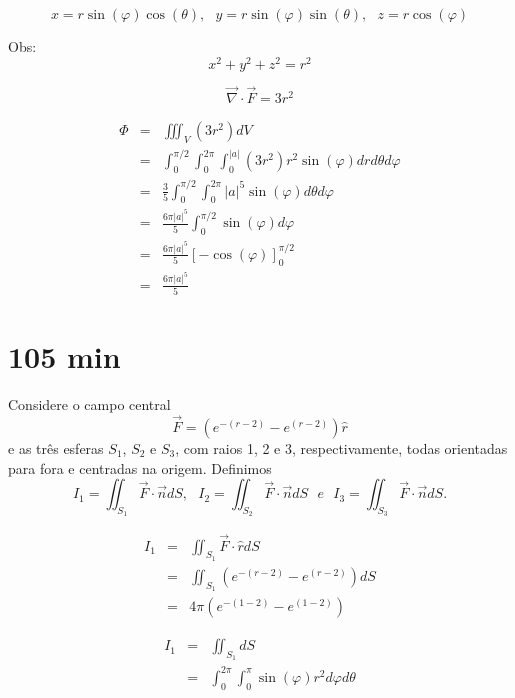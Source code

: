 \documentclass[a4paper,10pt]{book}
\begin{document}
 $$x=r\sin(\varphi)\cos(\theta) ,~~~ y=r\sin(\varphi)\sin(\theta), ~~~z=r \cos(\varphi)$$

Obs: $$x^2+y^2+z^2=r^2$$


$$\vec{\nabla}\cdot \vec{F}=3r^2$$

\begin{eqnarray*}\Phi&=&\iiint_V(3r^2)dV\\
&=&\int_0^{\pi/2} \int_0^{2\pi} \int_0^{|a|}(3r^2) r^2\sin(\varphi) dr d\theta d\varphi\\
&=&\frac{3}{5}\int_0^{\pi/2} \int_0^{2\pi} |a|^5\sin(\varphi)  d\theta d\varphi\\
&=&\frac{6\pi|a|^5}{5}\int_0^{\pi/2}  \sin(\varphi)  d\varphi\\
&=&\frac{6\pi|a|^5}{5}\left[-\cos(\varphi)\right]_0^{\pi/2}\\
&=&\frac{6\pi|a|^5}{5}
\end{eqnarray*}


\section{105 min}

Considere o campo central $$\vec {F}=(e^{-(r-2)}-e^{(r-2)})\hat {r}$$
e as três esferas $S_1$, $S_2$ e $S_3$, com raios 1, 2 e 3, respectivamente, todas orientadas para fora e centradas na origem. Definimos $$I_1=\iint _{S_1}\vec {F}\cdot \vec {n}dS,~~~ I_2=\iint _{S_2}\vec {F}\cdot \vec {n}dS ~~~ e  ~~~ I_3=\iint _{S_3}\vec {F}\cdot \vec {n}dS.$$

\begin{eqnarray*}I_1&=&\iint _{S_1}\vec {F}\cdot \hat {r}dS\\
&=&\iint _{S_1}(e^{-(r-2)}-e^{(r-2)})dS\\
&=&4\pi(e^{-(1-2)}-e^{(1-2)})
 \end{eqnarray*}

\begin{eqnarray*}I_1&=&\iint _{S_1}dS\\
&=&\int_0^{2\pi}\int_0^{\pi}\sin(\varphi)r^2d\varphi d\theta
 \end{eqnarray*}

 
\end{document}
